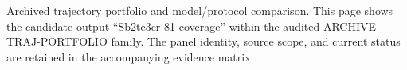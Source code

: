 Archived trajectory portfolio and model/protocol comparison. This page shows the candidate output ``Sb2te3cr 81 coverage'' within the audited ARCHIVE-TRAJ-PORTFOLIO family. The panel identity, source scope, and current status are retained in the accompanying evidence matrix.

